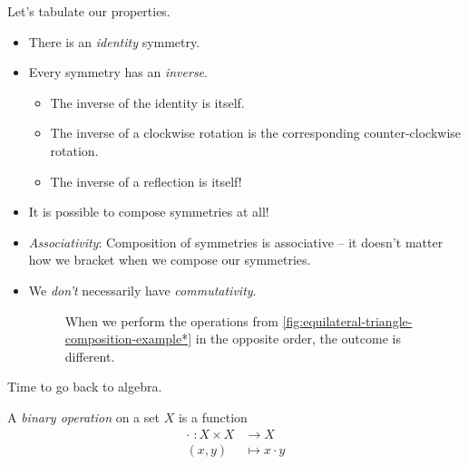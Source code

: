 \documentclass{../template/note}
\begin{document}
    Let's tabulate our properties.
    \begin{itemize}
        \item There is an \emph{identity} symmetry.
        \item Every symmetry has an \emph{inverse}.
        \begin{itemize}
            \item The inverse of the identity is itself.
            \item The inverse of a clockwise rotation is the corresponding counter-clockwise rotation.
            \item The inverse of a reflection is itself!
        \end{itemize}
        \item It is possible to compose symmetries at all!
        \item \emph{Associativity}: Composition of symmetries is associative -- it doesn't matter how we bracket when we compose our symmetries.
        \item We \emph{don't} necessarily have \emph{commutativity}.
        
        \begin{figure}[ht]
            \centering
            \caption{When we perform the operations from \cref{fig:equilateral-triangle-composition-example*} in the opposite order, the outcome is different.}
            \label{fig:equilateral-triangle-commutativity-failure}
        \end{figure}
        
    \end{itemize}

    Time to go back to algebra.

    \begin{definition}
        A \emph{binary operation} on a set \(X\) is a function
        \begin{align*}
            \cdot\; \colon X \times X &\to X \\
            (x, y) &\mapsto x \cdot y
        \end{align*}
    \end{definition}
    
\end{document}
